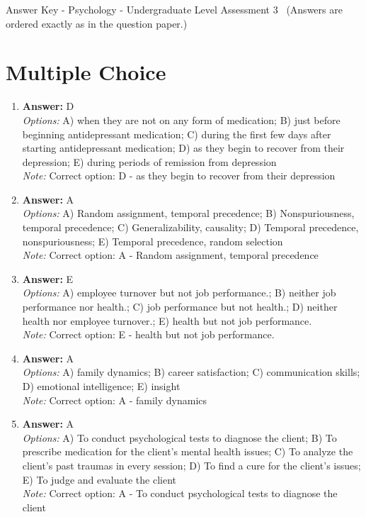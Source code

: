 \documentclass[12pt]{article}
\begin{document}
\begin{center}
Answer Key - Psychology - Undergraduate Level Assessment 3 \
\small (Answers are ordered exactly as in the question paper.)
\end{center}

\section*{Multiple Choice}
\begin{enumerate}[label=\arabic*.]
\item \textbf{Answer:} D
\\ \textit{Options:} A) when they are not on any form of medication; B) just before beginning antidepressant medication; C) during the first few days after starting antidepressant medication; D) as they begin to recover from their depression; E) during periods of remission from depression
\\ \textit{Note:} Correct option: D - as they begin to recover from their depression
\item \textbf{Answer:} A
\\ \textit{Options:} A) Random assignment, temporal precedence; B) Nonspuriousness, temporal precedence; C) Generalizability, causality; D) Temporal precedence, nonspuriousness; E) Temporal precedence, random selection
\\ \textit{Note:} Correct option: A - Random assignment, temporal precedence
\item \textbf{Answer:} E
\\ \textit{Options:} A) employee turnover but not job performance.; B) neither job performance nor health.; C) job performance but not health.; D) neither health nor employee turnover.; E) health but not job performance.
\\ \textit{Note:} Correct option: E - health but not job performance.
\item \textbf{Answer:} A
\\ \textit{Options:} A) family dynamics; B) career satisfaction; C) communication skills; D) emotional intelligence; E) insight
\\ \textit{Note:} Correct option: A - family dynamics
\item \textbf{Answer:} A
\\ \textit{Options:} A) To conduct psychological tests to diagnose the client; B) To prescribe medication for the client's mental health issues; C) To analyze the client's past traumas in every session; D) To find a cure for the client's issues; E) To judge and evaluate the client
\\ \textit{Note:} Correct option: A - To conduct psychological tests to diagnose the client
\end{enumerate}
\end{document}
